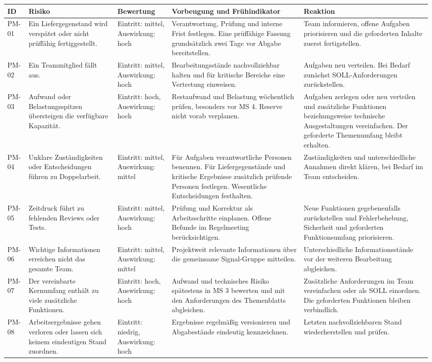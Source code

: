 \documentclass[11pt,a4paper]{article}
\begin{document}
\begin{tabularx}{\linewidth}{@{}l Y p{.2\linewidth} Y Y@{}}
\toprule
\textbf{ID} & \textbf{Risiko} & \textbf{Bewertung} & \textbf{Vorbeugung und Frühindikator} & \textbf{Reaktion} \\
\midrule
\endhead
PM-01 & Ein Liefergegenstand wird verspätet oder nicht prüffähig fertiggestellt. & Eintritt: mittel, Auswirkung: hoch & Verantwortung, Prüfung und interne Frist festlegen. Eine prüffähige Fassung grundsätzlich zwei Tage vor Abgabe bereitstellen. & Team informieren, offene Aufgaben priorisieren und die geforderten Inhalte zuerst fertigstellen. \\
PM-02 & Ein Teammitglied fällt aus. & Eintritt: mittel, Auswirkung: hoch & Bearbeitungsstände nachvollziehbar halten und für kritische Bereiche eine Vertretung einweisen. & Aufgaben neu verteilen. Bei Bedarf zunächst SOLL-Anforderungen zurückstellen. \\
PM-03 & Aufwand oder Belastungsspitzen übersteigen die verfügbare Kapazität. & Eintritt: hoch, Auswirkung: hoch & Restaufwand und Belastung wöchentlich prüfen, besonders vor MS 4. Reserve nicht vorab verplanen. & Aufgaben zerlegen oder neu verteilen und zusätzliche Funktionen beziehungsweise technische Ausgestaltungen vereinfachen. Der geforderte Themenumfang bleibt erhalten. \\
PM-04 & Unklare Zuständigkeiten oder Entscheidungen führen zu Doppelarbeit. & Eintritt: mittel, Auswirkung: mittel & Für Aufgaben verantwortliche Personen benennen. Für Liefergegenstände und kritische Ergebnisse zusätzlich prüfende Personen festlegen. Wesentliche Entscheidungen festhalten. & Zuständigkeiten und unterschiedliche Annahmen direkt klären, bei Bedarf im Team entscheiden. \\
PM-05 & Zeitdruck führt zu fehlenden Reviews oder Tests. & Eintritt: mittel, Auswirkung: hoch & Prüfung und Korrektur als Arbeitsschritte einplanen. Offene Befunde im Regelmeeting berücksichtigen. & Neue Funktionen gegebenenfalls zurückstellen und Fehlerbehebung, Sicherheit und geforderten Funktionsumfang priorisieren. \\
PM-06 & Wichtige Informationen erreichen nicht das gesamte Team. & Eintritt: mittel, Auswirkung: mittel & Projektweit relevante Informationen über die gemeinsame Signal-Gruppe mitteilen. & Unterschiedliche Informationsstände vor der weiteren Bearbeitung abgleichen. \\
PM-07 & Der vereinbarte Kernumfang enthält zu viele zusätzliche Funktionen. & Eintritt: hoch, Auswirkung: hoch & Aufwand und technisches Risiko spätestens in MS 3 bewerten und mit den Anforderungen des Themenblatts abgleichen. & Zusätzliche Anforderungen im Team vereinfachen oder als SOLL einordnen. Die geforderten Funktionen bleiben verbindlich. \\
PM-08 & Arbeitsergebnisse gehen verloren oder lassen sich keinem eindeutigen Stand zuordnen. & Eintritt: niedrig, Auswirkung: hoch & Ergebnisse regelmäßig versionieren und Abgabestände eindeutig kennzeichnen. & Letzten nachvollziehbaren Stand wiederherstellen und prüfen. \\
\bottomrule
\end{tabularx}
\end{document}
